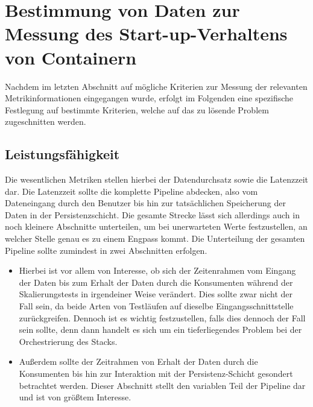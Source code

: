 \section{Bestimmung von Daten zur Messung des Start-up-Verhaltens von Containern \checkmark}

Nachdem im letzten Abschnitt auf mögliche Kriterien zur Messung der relevanten Metrikinformationen eingegangen wurde, erfolgt im Folgenden eine spezifische Festlegung auf bestimmte Kriterien, welche auf das zu lösende Problem zugeschnitten werden.


\subsection{Leistungsfähigkeit \checkmark}
Die wesentlichen Metriken stellen hierbei der Datendurchsatz sowie die Latenzzeit dar. Die Latenzzeit sollte die komplette Pipeline abdecken, also vom Dateneingang durch den Benutzer bis hin zur tatsächlichen Speicherung der Daten in der Persistenzschicht. Die gesamte Strecke lässt sich allerdings auch in noch kleinere Abschnitte unterteilen, um bei unerwarteten Werte festzustellen, an welcher Stelle genau es zu einem Engpass kommt. Die Unterteilung der gesamten Pipeline sollte zumindest in zwei Abschnitten erfolgen.

\begin{itemize}
  \item Hierbei ist vor allem von Interesse, ob sich der Zeitenrahmen vom Eingang der Daten bis zum Erhalt der Daten durch die Konsumenten während der Skalierungstests in irgendeiner Weise verändert. Dies sollte zwar nicht der Fall sein, da beide Arten von Testläufen auf dieselbe Eingangsschnittstelle zurückgreifen. Dennoch ist es wichtig festzustellen, falls dies dennoch der Fall sein sollte, denn dann handelt es sich um ein tieferliegendes Problem bei der Orchestrierung des Stacks.
  \item Außerdem sollte der Zeitrahmen von Erhalt der Daten durch die Konsumenten bis hin zur Interaktion mit der Persistenz-Schicht gesondert betrachtet werden. Dieser Abschnitt stellt den variablen Teil der Pipeline dar und ist von größtem Interesse. 
\end{itemize}

